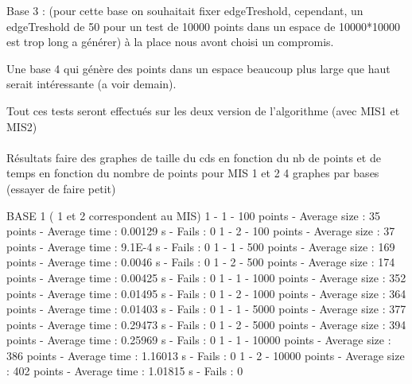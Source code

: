 Base 3 : (pour cette base on souhaitait fixer edgeTreshold, cependant, un edgeTreshold de 50 pour un test de 10000 points dans un espace de 10000*10000 est trop long a générer) à la place nous avont choisi un compromis.

Une base 4 qui génère des points dans un espace beaucoup plus large que haut serait intéressante (a voir demain).

Tout ces tests seront effectués sur les deux version de l'algorithme (avec MIS1 et MIS2)

\paragraph{}
Résultats faire des graphes de taille du cds en fonction du nb de points et de temps en fonction du nombre de points pour MIS 1 et 2
4 graphes par bases (essayer de faire petit)

\begin{figure}
\begin{center}
\end{center}
\end{figure}

BASE 1 ( 1 et 2 correspondent au MIS)
1 - 1 - 100 points - Average size : 35 points - Average time : 0.00129 s - Fails : 0
1 - 2 - 100 points - Average size : 37 points - Average time : 9.1E-4 s - Fails : 0
1 - 1 - 500 points - Average size : 169 points - Average time : 0.0046 s - Fails : 0
1 - 2 - 500 points - Average size : 174 points - Average time : 0.00425 s - Fails : 0
1 - 1 - 1000 points - Average size : 352 points - Average time : 0.01495 s - Fails : 0
1 - 2 - 1000 points - Average size : 364 points - Average time : 0.01403 s - Fails : 0
1 - 1 - 5000 points - Average size : 377 points - Average time : 0.29473 s - Fails : 0
1 - 2 - 5000 points - Average size : 394 points - Average time : 0.25969 s - Fails : 0
1 - 1 - 10000 points - Average size : 386 points - Average time : 1.16013 s - Fails : 0
1 - 2 - 10000 points - Average size : 402 points - Average time : 1.01815 s - Fails : 0

